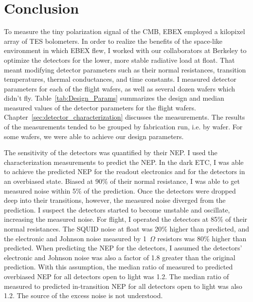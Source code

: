 \chapter{Conclusion}
\label{conclusion_chapter}

To measure the tiny polarization signal of the \ac{CMB}, \ac{EBEX} employed a kilopixel array of \ac{TES} bolometers. 
In order to realize the benefits of the space-like environment in which \ac{EBEX} flew, I worked with our collaborators at Berkeley to optimize the detectors for the lower, more stable radiative load at float.  
That meant modifying detector parameters such as their normal resistances, transition temperatures, thermal conductances, and time constants. 
I measured detector parameters for each of the flight wafers, as well as several dozen wafers which didn't fly. 
Table~\ref{tab:Design_Params} summarizes the design and median measured values of the detector parameters for the flight wafers. 
Chapter~\ref{sec:detector_characterization} discusses the measurements. 
The results of the measurements tended to be grouped by fabrication run, i.e. by wafer. 
For some wafers, we were able to achieve our design parameters. 

The sensitivity of the detectors was quantified by their \ac{NEP}. 
I used the characterization measurements to predict the \ac{NEP}.
In the dark \ac{ETC}, I was able to achieve the predicted \ac{NEP} for the readout electronics and for the detectors in an overbiased state.
Biased at 90\% of their normal resistance, I was able to get measured noise within 5\% of the prediction. 
Once the detectors were dropped deep into their transitions, however, the measured noise diverged from the prediction. 
I suspect the detectors started to become unstable and oscillate, increasing the measured noise. 
For flight, I operated the detectors at 85\% of their normal resistances. 
The \ac{SQUID} noise at float was 20\% higher than predicted, and the electronic and Johnson noise measured by 1~$\Omega$ resistors was 80\% higher than predicted. 
When predicting the \ac{NEP} for the detectors, I assumed the detectors' electronic and Johnson noise was also a factor of 1.8 greater than the original prediction. 
With this assumption, the median ratio of measured to predicted overbiased \ac{NEP} for all detectors open to light was 1.2. 
The median ratio of measured to predicted in-transition \ac{NEP} for all detectors open to light was also 1.2. 
The source of the excess noise is not understood. 

